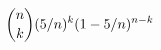 \documentclass[preview]{standalone}
\begin{document}
\begin{align*}
\special{dvisvgm:raw <g id='unique000'>}\binom nk(5/n)^k(1-5/n)^{n-k}\special{dvisvgm:raw </g>}
\end{align*}
\end{document}
